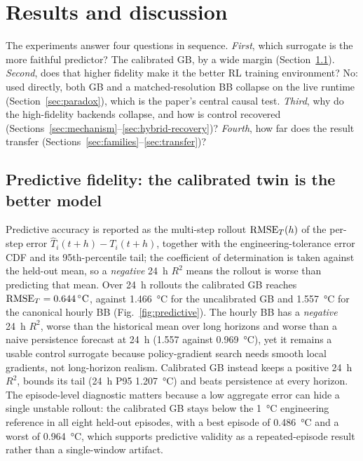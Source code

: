 \section{Results and discussion}\label{sec:results}

The experiments answer four questions in sequence. \emph{First}, which surrogate is the more
faithful predictor? The calibrated GB, by a wide margin (Section~\ref{sec:fidelity}). \emph{Second},
does that higher fidelity make it the better RL training environment? No: used directly, both GB and
a matched-resolution BB collapse on the live runtime (Section~\ref{sec:paradox}), which is the
paper's central causal test. \emph{Third}, why do the high-fidelity backends collapse, and how is
control recovered (Sections~\ref{sec:mechanism}--\ref{sec:hybrid-recovery})? \emph{Fourth}, how far
does the result transfer (Sections~\ref{sec:families}--\ref{sec:transfer})?

\subsection{Predictive fidelity: the calibrated twin is the better model}\label{sec:fidelity}

Predictive accuracy is reported as the multi-step rollout $\mathrm{RMSE}_T(h)$ of the per-step error
$\widehat{T}_i(t+h)-T_i(t+h)$, together with the engineering-tolerance error CDF and its
95th-percentile tail; the coefficient of determination is taken against the held-out mean, so a
\emph{negative} 24~h $R^2$ means the rollout is worse than predicting that mean. Over 24~h
rollouts the calibrated GB reaches $\mathrm{RMSE}_T=\SI{0.644}{\celsius}$, against
\SI{1.466}{\celsius} for the uncalibrated GB and \SI{1.557}{\celsius} for the canonical hourly BB
(Fig.~\ref{fig:predictive}). The hourly BB has a \emph{negative} 24~h $R^2$, worse than the
historical mean over long horizons and worse than a naive persistence forecast at 24~h (1.557
against \SI{0.969}{\celsius}), yet it remains a usable control surrogate because policy-gradient
search needs smooth local gradients, not long-horizon realism. Calibrated GB instead keeps a
positive 24~h $R^2$, bounds its tail (24~h P95 \SI{1.207}{\celsius}) and beats persistence at every
horizon. The episode-level diagnostic matters because a low aggregate error can hide a single
unstable rollout: the calibrated GB stays below the \SI{1}{\celsius} engineering reference in all
eight held-out episodes, with a best episode of \SI{0.486}{\celsius} and a worst of
\SI{0.964}{\celsius}, which supports predictive validity as a repeated-episode result rather than a
single-window artifact.

